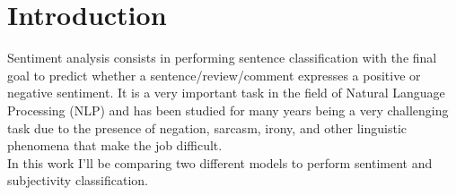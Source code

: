 
\vspace{-0.5cm}
\section{Introduction}
\label{sec:intro}
Sentiment analysis consists in performing sentence classification with the final goal to predict whether a sentence/review/comment expresses a positive or negative sentiment.
It is a very important task in the field of Natural Language Processing (NLP) and has been studied for many years being a very challenging task due to the 
presence of negation, sarcasm, irony, and other linguistic phenomena that make the job difficult.\\ 
In this work I'll be comparing two different models to perform sentiment and subjectivity classification. 

\vspace{-0.25cm}
